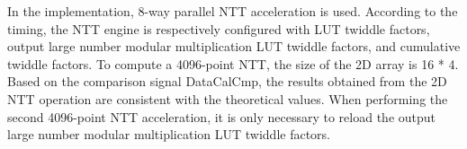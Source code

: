 In the implementation, 8-way parallel NTT acceleration is used. According to the timing, the NTT engine is respectively configured with LUT twiddle factors, output large number modular multiplication LUT twiddle factors, and cumulative twiddle factors. To compute a 4096-point NTT, the size of the 2D array is 16 * 4. Based on the comparison signal DataCalCmp, the results obtained from the 2D NTT operation are consistent with the theoretical values. When performing the second 4096-point NTT acceleration, it is only necessary to reload the output large number modular multiplication LUT twiddle factors.
